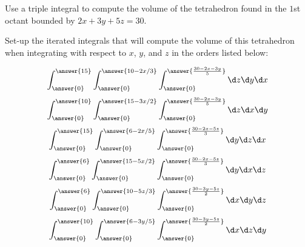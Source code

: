 \documentclass{ximera}
\author{Bart Snapp}
\begin{document}
\begin{exercise}
  Use a triple integral to compute the volume of the tetrahedron found
  in the $1$st octant bounded by $2x+3y+5z=30$.
    
  Set-up the iterated integrals that will compute the volume of this
  tetrahedron when integrating with respect to $x$, $y$, and $z$ in
  the orders listed below:
  \begin{prompt}
    \[
    \int_{\answer{0}}^{\answer{15}} \int_{\answer{0}}^{\answer{10-2x/3}} \int_{\answer{0}}^{\answer{\frac{30-2x-3y}{5}}}\d z \d y \d x
    \]
    \[
    \int_{\answer{0}}^{\answer{10}} \int_{\answer{0}}^{\answer{15-3x/2}} \int_{\answer{0}}^{\answer{\frac{30-2x-3y}{5}}}\d z \d x \d y
    \]
    \[
    \int_{\answer{0}}^{\answer{15}} \int_{\answer{0}}^{\answer{6-2x/5}}  \int_{\answer{0}}^{\answer{\frac{30-2x-5z}{3}}}\d y \d z \d x
    \]
    \[
    \int_{\answer{0}}^{\answer{6}}  \int_{\answer{0}}^{\answer{15-5x/2}} \int_{\answer{0}}^{\answer{\frac{30-2x-5z}{3}}}\d y \d x \d z
    \]
    \[
    \int_{\answer{0}}^{\answer{6}}  \int_{\answer{0}}^{\answer{10-5z/3}} \int_{\answer{0}}^{\answer{\frac{30-3y-5z}{2}}}\d x \d y \d z
    \]
    \[
    \int_{\answer{0}}^{\answer{10}} \int_{\answer{0}}^{\answer{6-3y/5}}  \int_{\answer{0}}^{\answer{\frac{30-3y-5z}{2}}}\d x \d z \d y
    \]
  \end{prompt}
\end{exercise}
\end{document}
